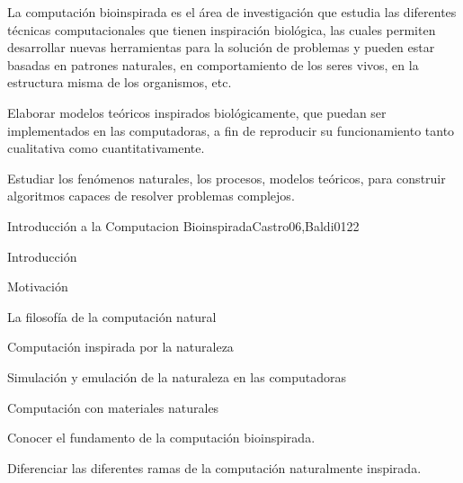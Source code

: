 \begin{syllabus}


\begin{justification}
La computación bioinspirada es el área de investigación que estudia
las diferentes técnicas computacionales que tienen inspiración
biológica, las cuales permiten desarrollar nuevas herramientas para
la solución de problemas y pueden estar basadas en patrones
naturales, en comportamiento de los seres vivos, en la estructura
misma de los organismos, etc. 
\end{justification}

\begin{goals}
\item Elaborar modelos teóricos inspirados biológicamente, que puedan ser implementados en las computadoras, a fin de reproducir su funcionamiento tanto cualitativa como cuantitativamente.
\item Estudiar los fenómenos naturales, los procesos, modelos teóricos, para construir algoritmos capaces de resolver problemas complejos.
\end{goals}

\begin{outcomes}
\end{outcomes}

\begin{unit}{Introducción a la Computacion Bioinspirada}{Castro06,Baldi01}{2}{2}
\begin{topics}
        \item Introducción
        \item Motivación
        \item La filosofía de la computación natural
        \item Computación inspirada por la naturaleza
        \item Simulación y emulación de la naturaleza en las computadoras
        \item Computación con materiales naturales
    \end{topics}
    \begin{learningoutcomes}
        \item Conocer el fundamento de la computación bioinspirada.
        \item Diferenciar las diferentes ramas de la computación naturalmente inspirada.
    \end{learningoutcomes}
\end{unit}


\end{syllabus}
